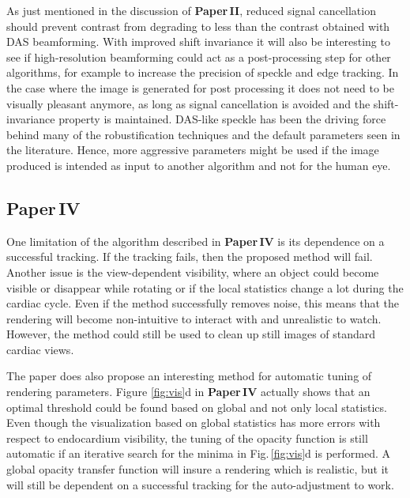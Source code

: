 As just mentioned in the discussion of \textbf{Paper\,II}, reduced signal cancellation should prevent contrast from degrading to less than the contrast obtained with DAS beamforming. %
With improved shift invariance it will also be interesting to see if high-resolution beamforming could act as a post-processing step for other algorithms, for example to increase the precision of speckle and edge tracking. In the case where the image is generated for post processing it does not need to be visually pleasant anymore, as long as signal cancellation is avoided and the shift-invariance property is maintained. DAS-like speckle has been the driving force behind many of the robustification techniques and the default parameters seen in the literature. Hence, more aggressive parameters might be used if the image produced is intended as input to another algorithm and not for the human eye.

\subsection{Paper\,IV}
One limitation of the algorithm described in \textbf{Paper\,IV} is its dependence on a successful tracking. If the tracking fails, then the proposed method will fail.  Another issue is the view-dependent visibility, where an object could become visible or disappear while rotating or if the local statistics change a lot during the cardiac cycle. Even if the method successfully removes noise, this means that the rendering will become non-intuitive to interact with and unrealistic to watch. However, the method could still be used to clean up still images of standard cardiac views. 

The paper does also propose an interesting method for automatic tuning of rendering parameters. Figure \ref{fig:vis}d in \textbf{Paper\,IV} actually shows that an optimal threshold could be found based on global and not only local statistics. Even though the visualization based on global statistics has more errors with respect to endocardium visibility, the tuning of the opacity function is still automatic if an iterative search for the minima in Fig.\,\ref{fig:vis}d is performed. A global opacity transfer function will insure a rendering which is realistic, but it will still be dependent on a successful tracking for the auto-adjustment to work. 

